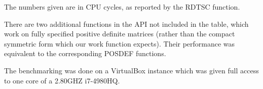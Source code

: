 \documentclass[12pt]{article}
\begin{document}
The numbers given are in CPU cycles, as reported by the RDTSC function.

There are two additional functions in the API not included in the table, which
work on fully specified positive definite matrices (rather than the compact
symmetric form which our work function expects). Their performance was
equivalent to the corresponding POSDEF functions.

The benchmarking was done on a VirtualBox instance which was given full access
to one core of a 2.80GHZ i7-4980HQ.
\\

\end{document}
